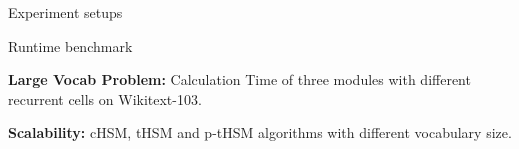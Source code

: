 \documentclass[final,t,unknownkeysallowed]{beamer}
\begin{document}
\begin{frame}{}
\begin{columns}[t]
\begin{column}{.3\linewidth}
\begin{block}{Experiment setups}
      \end{block}
      \begin{block}{Runtime benchmark}
      \begin{figure}
      \setlength{\abovecaptionskip}{0pt}
      \setlength{\abovedisplayskip}{0pt}
      \setlength{\belowcaptionskip}{0pt}
      \setlength{\belowdisplayskip}{0pt}
      \end{figure}
      \textbf{Large Vocab Problem:} Calculation Time of three modules with different recurrent cells on Wikitext-103.
      \begin{figure}\small
      \setlength{\abovecaptionskip}{0pt}
        \setlength{\abovedisplayskip}{0pt}
        \setlength{\belowcaptionskip}{0pt}
        \setlength{\belowdisplayskip}{0pt}
      \end{figure}
      \textbf{Scalability:}  cHSM, tHSM and p-tHSM algorithms with different vocabulary size.
      \end{block}
    \end{column}
    

\end{columns}
\end{frame}
\end{document}
